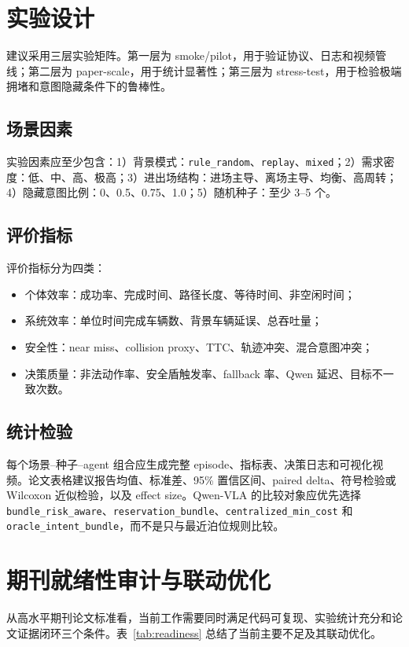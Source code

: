 \documentclass[conference]{IEEEtran}
\begin{document}
\section{实验设计}
建议采用三层实验矩阵。第一层为 smoke/pilot，用于验证协议、日志和视频管线；第二层为 paper-scale，用于统计显著性；第三层为 stress-test，用于检验极端拥堵和意图隐藏条件下的鲁棒性。

\subsection{场景因素}
实验因素应至少包含：1）背景模式：\texttt{rule\_random}、\texttt{replay}、\texttt{mixed}；2）需求密度：低、中、高、极高；3）进出场结构：进场主导、离场主导、均衡、高周转；4）隐藏意图比例：0、0.5、0.75、1.0；5）随机种子：至少 3--5 个。

\subsection{评价指标}
评价指标分为四类：
\begin{itemize}
    \item 个体效率：成功率、完成时间、路径长度、等待时间、非空闲时间；
    \item 系统效率：单位时间完成车辆数、背景车辆延误、总吞吐量；
    \item 安全性：near miss、collision proxy、TTC、轨迹冲突、混合意图冲突；
    \item 决策质量：非法动作率、安全盾触发率、fallback 率、Qwen 延迟、目标不一致次数。
\end{itemize}

\subsection{统计检验}
每个场景--种子--agent 组合应生成完整 episode、指标表、决策日志和可视化视频。论文表格建议报告均值、标准差、95\% 置信区间、paired delta、符号检验或 Wilcoxon 近似检验，以及 effect size。Qwen-VLA 的比较对象应优先选择 \texttt{bundle\_risk\_aware}、\texttt{reservation\_bundle}、\texttt{centralized\_min\_cost} 和 \texttt{oracle\_intent\_bundle}，而不是只与最近泊位规则比较。


\section{期刊就绪性审计与联动优化}
从高水平期刊论文标准看，当前工作需要同时满足代码可复现、实验统计充分和论文证据闭环三个条件。表~\ref{tab:readiness} 总结了当前主要不足及其联动优化。
\end{document}
